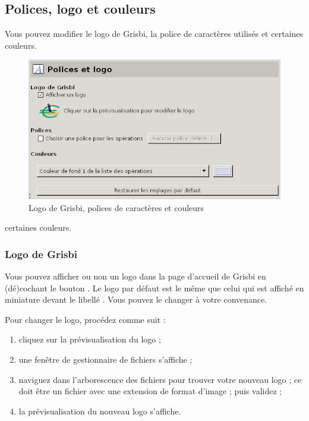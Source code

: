 \subsection{Polices, logo et couleurs\label{setup-display-logo}}

Vous pouvez modifier le logo de Grisbi, la police de caractères utilisés et \ifIllustration certaines couleurs.
\begin{figure}[htbp]
\begin{center}
\includegraphics[scale=0.5]{image/screenshot/setup_fonts_logo}
\end{center}
\caption{Logo de Grisbi, polices de caractères et couleurs}
\label{setup-fonts-logo-img}
\end{figure}
\else certaines couleurs.
\fi


\subsubsection{Logo de Grisbi\label{setup-display-logo-icon}}

Vous pouvez afficher ou non un logo dans la page d'accueil de Grisbi en (dé)cochant le bouton . Le logo par défaut est le même que celui qui est affiché en miniature devant le libellé . Vous pouvez le changer à votre convenance. 

Pour changer le logo, procédez comme suit :

\begin{enumerate}
	\item cliquez sur la prévisualisation du logo ;
	\item une fenêtre de gestionnaire de fichiers s'affiche ;
	\item naviguez dans l'arborescence des fichiers pour trouver votre nouveau logo ; ce doit être un fichier avec une extension de format d'image ; puis validez ;
	\item la prévisualisation du nouveau logo s'affiche.
\end{enumerate}

